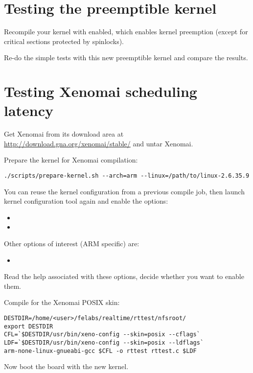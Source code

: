 \section{Testing the preemptible kernel}

Recompile your kernel with  enabled, which
enables kernel preemption (except for critical sections protected by
spinlocks).

Re-do the simple tests with this new preemptible kernel and compare
the results.

\section{Testing Xenomai scheduling latency}

Get Xenomai from its download area at
\url{http://download.gna.org/xenomai/stable/} and untar Xenomai.

Prepare the kernel for Xenomai compilation:
\begin{verbatim}
./scripts/prepare-kernel.sh --arch=arm --linux=/path/to/linux-2.6.35.9
\end{verbatim}

You can reuse the kernel configuration from a previous compile job,
then launch kernel configuration tool again and enable the options:
\begin{itemize}
\item {}
\item {}
\end{itemize}

Other options of interest (ARM specific) are:
\begin{itemize}
\item {}
\end{itemize}

Read the help associated with these options, decide whether you want
to enable them.

Compile  for the Xenomai POSIX skin:

\begin{verbatim}
DESTDIR=/home/<user>/felabs/realtime/rttest/nfsroot/
export DESTDIR
CFL=`$DESTDIR/usr/bin/xeno-config --skin=posix --cflags`
LDF=`$DESTDIR/usr/bin/xeno-config --skin=posix --ldflags`
arm-none-linux-gnueabi-gcc $CFL -o rttest rttest.c $LDF
\end{verbatim}

Now boot the board with the new kernel.

